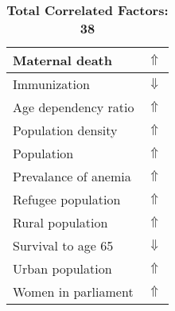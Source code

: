 \documentclass[12pt,notitlepage,oneside]{report}
\begin{document}
\begin{table}[!htb]
\begin{tabular}{|l|l|}
Maternal death & $\Uparrow$\\ \hline
Immunization & $\Downarrow$\\ \hline
Age dependency ratio & $\Uparrow$\\ \hline
Population density & $\Uparrow$\\ \hline
Population & $\Uparrow$\\ \hline
Prevalance of anemia & $\Uparrow$\\ \hline
Refugee population & $\Uparrow$\\ \hline
Rural population & $\Uparrow$\\ \hline
Survival to age 65 & $\Downarrow$\\ \hline
Urban population & $\Uparrow$\\ \hline
Women in parliament & $\Uparrow$\\ \hline
\end{tabular}
\caption*{\textbf{Total Correlated Factors: 38}}
\end{table}
\clearpage
\end{document}
